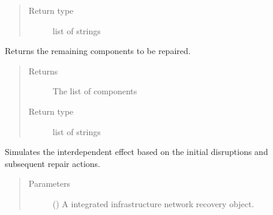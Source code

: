 \documentclass[letterpaper,10pt,english]{sphinxmanual}
\begin{document}
\begin{fulllineitems}
\begin{fulllineitems}
\begin{quote}
\begin{description}
\item[{Return type}] \leavevmode
\sphinxAtStartPar
list of strings

\end{description}\end{quote}

\end{fulllineitems}


\begin{fulllineitems}
\label{\detokenize{apidoc:dreaminsg_integrated_model.src.simulation.NetworkSimulation.get_components_to_repair}}
\sphinxAtStartPar
Returns the remaining components to be repaired.
\begin{quote}\begin{description}
\item[{Returns}] \leavevmode
\sphinxAtStartPar
The list of components

\item[{Return type}] \leavevmode
\sphinxAtStartPar
list of strings

\end{description}\end{quote}

\end{fulllineitems}


\begin{fulllineitems}
\label{\detokenize{apidoc:dreaminsg_integrated_model.src.simulation.NetworkSimulation.simulate_interdependent_effects}}
\sphinxAtStartPar
Simulates the interdependent effect based on the initial disruptions and subsequent repair actions.
\begin{quote}\begin{description}
\item[{Parameters}] \leavevmode
\sphinxAtStartPar
{} () \textendash{} A integrated infrastructure network recovery object.


\end{description}
\end{quote}
\end{fulllineitems}
\end{fulllineitems}
\end{document}
